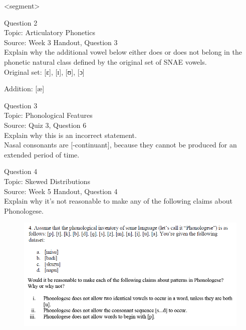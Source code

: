 \documentclass[12pt]{article}
\begin{document}
<segment>


\newpage

{\large Question 2}\\

Topic: Articulatory Phonetics\\
Source: Week 3 Handout, Question 3\\

Explain why the additional vowel below either does or does not belong in the phonetic natural class defined by the original set of SNAE vowels.\\

Original set: {[ɛ]}, {[ɪ]}, {[ʊ]}, {[ɔ]}

Addition: {[æ]}


\newpage

{\large Question 3}\\

Topic: Phonological Features\\
Source: Quiz 3, Question 6\\

Explain why this is an incorrect statement.\\

Nasal consonants are {[-continuant]}, because they cannot be produced for an extended period of time.


\newpage

{\large Question 4}\\

Topic: Skewed Distributions\\
Source: Week 5 Handout, Question 4\\

Explain why it's not reasonable to make any of the following claims about Phonologese.\\

\begin{figure}[H]
\includegraphics{../images/Phonologese.png}
\end{figure}
\end{document}
